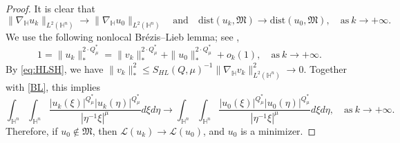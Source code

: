 \documentclass[10pt,a4paper]{amsart}
\begin{document}
\begin{proof}
It is clear that
\begin{equation*}
\|\nabla_\mathbb{H} u_k\|_{L^2(\mathbb{H}^n)}\rightarrow \|\nabla_\mathbb{H} u_0\|_{L^2(\mathbb{H}^n)}\quad \mathrm{and}\quad \mathrm{dist}(u_k,\mathfrak{M})\rightarrow \mathrm{dist}(u_0,\mathfrak{M}),\quad \mathrm{as}~ k\rightarrow+\infty.
\end{equation*}
 {We use the following nonlocal Br\'{e}zis--Lieb lemma; see
\cite[Lemma 2.5]{GS20},}
\begin{equation}\label{BL}
 1=\|u_k\|_*^{2\cdot Q^{\ast}_{\mu}}=\|v_k\|_*^{2\cdot Q^{\ast}_{\mu}}+\|u_0\|_*^{2\cdot Q^{\ast}_{\mu}}+o_k(1),\quad \mathrm{as} ~k\rightarrow+\infty.
\end{equation}
By \eqref{eq:HLSH}, we have $\|v_k\|_*^{2}\leq S_{HL}(Q,\mu)^{-1} \|\nabla_\mathbb{H} v_k\|_{L^2(\mathbb{H}^n)}^2\rightarrow0$.
{Together with \eqref{BL}, this implies}
\begin{equation*}
 \int_{\mathbb{H}^{n}}\int_{\mathbb{H}^{n}}\frac{|u_k(\xi)|^{Q^{\ast}_{\mu}}|u_k(\eta)|
^{Q^{\ast}_{\mu}}}{|\eta^{-1}\xi|^{\mu}}{d}\xi{d}\eta\longrightarrow \int_{\mathbb{H}^{n}}\int_{\mathbb{H}^{n}}\frac{|u_0(\xi)|^{Q^{\ast}_{\mu}}|u_0(\eta)|
^{Q^{\ast}_{\mu}}}{|\eta^{-1}\xi|^{\mu}}{d}\xi{d}\eta,\quad \mathrm{as}~k\rightarrow+\infty.
\end{equation*}
Therefore, if $u_0\notin \mathfrak{M}$, then $\mathcal {L}(u_k)\rightarrow \mathcal {L}(u_0)$, and $u_0$ is a minimizer.


\end{proof}
\end{document}
